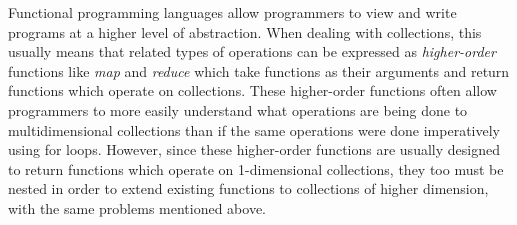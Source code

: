 Functional programming languages allow programmers to view and write programs at a higher level of abstraction.
When dealing with collections, this usually means that related types of operations can be expressed as \textit{higher-order} functions like \textit{map} and \textit{reduce} which take functions as their arguments and return functions which operate on collections.
These higher-order functions often allow programmers to more easily understand what operations are being done to multidimensional collections than if the same operations were done imperatively using for loops.
However, since these higher-order functions are usually designed to return functions which operate on 1-dimensional collections, they too must be nested in order to extend existing functions to collections of higher dimension, with the same problems mentioned above.



